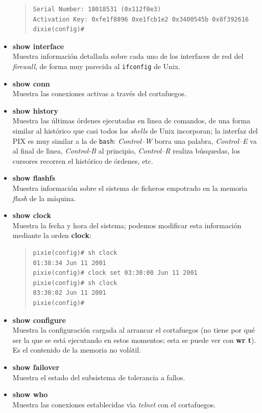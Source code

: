 \begin{itemize}
\begin{quote}
\begin{verbatim}
Serial Number: 18018531 (0x112f0e3)
Activation Key: 0xfe1f8896 0xe1fcb1e2 0x3400545b 0x8f392616
dixie(config)#
\end{verbatim}
\end{quote}
\item {\bf show interface}\\
Muestra informaci\'on detallada sobre cada uno de los interfaces de red del {\it firewall}, de forma muy parecida al {\tt ifconfig}
de Unix.
\item {\bf show conn}\\
Muestra las conexiones activas a trav\'es del cortafuegos.
\item {\bf show history}\\
Muestra las \'ultimas \'ordenes ejecutadas en l\'{\i}nea de comandos, de una forma similar al hist\'orico que casi todos los {\it 
shells} de Unix incorporan; la interfaz del PIX es muy similar a la de {\tt bash}: {\it Control--W} borra una palabra, {\it 
Control--E} va al final de l\'{\i}nea, {\it Control-B} al principio, {\it 
Control--R} realiza b\'usquedas, los cursores recorren el hist\'orico de 
\'ordenes, etc.
\item {\bf show flashfs}\\
Muestra informaci\'on sobre el sistema de ficheros empotrado en la memoria {\it flash} de la m\'aquina.
\item {\bf show clock}\\
Muestra la fecha y hora del sistema; podemos modificar esta informaci\'on 
mediante la orden {\bf clock}:
\begin{quote}
\begin{verbatim}
pixie(config)# sh clock
01:38:34 Jun 11 2001
pixie(config)# clock set 03:30:00 Jun 11 2001
pixie(config)# sh clock
03:30:02 Jun 11 2001
pixie(config)# 
\end{verbatim}
\end{quote}
\item {\bf show configure}\\
Muestra la configuraci\'on cargada al arrancar el cortafuegos (no tiene 
por qu\'e ser la que se est\'a ejecutando en estos momentos; esta se puede
ver con {\bf wr t}). Es el contenido de la memoria no vol\'atil.
\item {\bf show failover}\\
Muestra el estado del subsistema de tolerancia a fallos.
\item {\bf show who}\\
Muestra las conexiones establecidas v\'{\i}a {\it telnet} con el cortafuegos.
\end{itemize}
